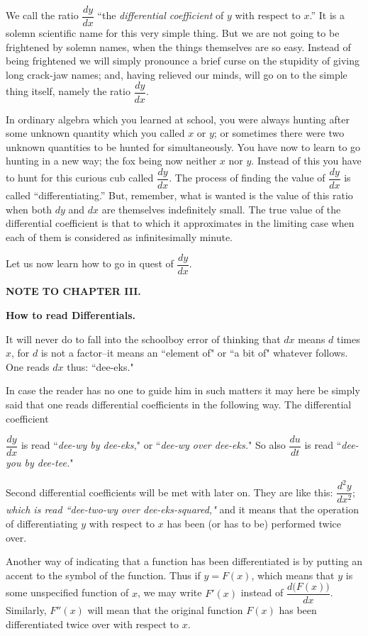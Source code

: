 \documentclass{ximera}
\begin{document}
We call the ratio $\dfrac{dy}{dx}$ ``the \textit{differential coefficient} of $y$
with respect to $x$.” It is a solemn scientific name
for this very simple thing. But we are not going
to be frightened by solemn names, when the things
themselves are so easy. Instead of being frightened
we will simply pronounce a brief curse on the
stupidity of giving long crack-jaw names; and, having
relieved our minds, will go on to the simple thing
itself, namely the ratio $\dfrac{dy}{dx}$.


In ordinary algebra which you learned at school,
you were always hunting after some unknown
quantity which you called $x$ or $y$; or sometimes
there were two unknown quantities to be hunted
for simultaneously. You have now to learn to go
hunting in a new way; the fox being now neither
$x$ nor $y$. Instead of this you have to hunt for this
curious cub called $\dfrac{dy}{dx}$. The process of finding the
value of $\dfrac{dy}{dx}$ is called ``differentiating.” But, remember,
what is wanted is the value of this ratio when both
$dy$ and $dx$ are themselves indefinitely small. The
true value of the differential coefficient is that to which
it approximates in the limiting case when each of
them is considered as infinitesimally minute.

Let us now learn how to go in quest of $\dfrac{dy}{dx}$.

\begin{center}
\textbf{NOTE TO CHAPTER III.}

\textbf{How to read Differentials.}
\end{center}

It will never do to fall into the schoolboy error of
thinking that $dx$ means $d$ times $x$, for $d$ is not a
factor–it means an ``element of" or ``a bit of"
whatever follows. One reads $dx$ thus: ``dee-eks."

In case the reader has no one to guide him in such
matters it may here be simply said that one reads
differential coefficients in the following way. The
differential coefficient

$\dfrac{dy}{dx}$
is read ``\textit{dee-wy by dee-eks,}" or ``\textit{dee-wy over dee-eks.}"
 So also
$\dfrac{du}{dt}$ is read ``\textit{dee-you by dee-tee.}"

Second differential coefficients will be met with
later on. They are like this: $\dfrac{d^2 y}{dx^2};$
\textit{which is read ``dee-two-wy over dee-eks-squared,"}
and it means that the operation of differentiating $y$
with respect to $x$ has been (or has to be) performed
twice over.

Another way of indicating that a function has been
differentiated is by putting an accent to the symbol of
the function. Thus if $y=F(x)$, which means that $y$
is some unspecified function of $x$, we may
write $F'(x)$ instead of $\dfrac{d\bigl(F(x)\bigr)}{dx}$. Similarly, $F''(x)$
will mean that the original function $F(x)$ has been
differentiated twice over with respect to $x$.
\end{document}
